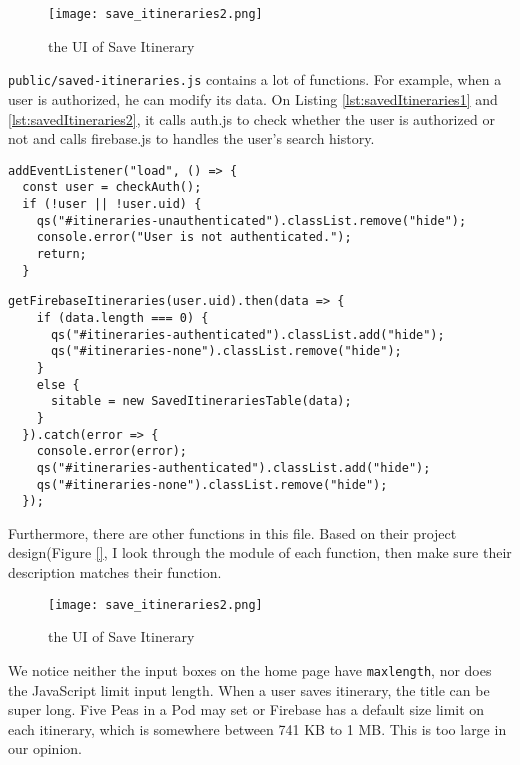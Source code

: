 \documentclass[12pt, a4paper]{article}
\newcommand{\code}[1]{\texttt{#1}}
\begin{document}
\begin{figure}[ht]
\centering
\texttt{[image: save\_itineraries2.png]}
\caption{the UI of Save Itinerary}
\label{fig:save_itineraries2}
\end{figure}

\code{public/saved-itineraries.js} contains a lot of functions. For example, when a user is authorized, he can modify its data. On Listing \ref{lst:savedItineraries1} and \ref{lst:savedItineraries2}, it calls auth.js to check whether the user is authorized or not and calls firebase.js to handles the user's search history.

\begin{lstlisting}[frame=tb, caption=checks if user is authenticated with a call , label=lst:savedItineraries1]
addEventListener("load", () => {
  const user = checkAuth();
  if (!user || !user.uid) {
    qs("#itineraries-unauthenticated").classList.remove("hide");
    console.error("User is not authenticated.");
    return;
  }
\end{lstlisting}

\begin{lstlisting}[frame=tb, caption=Pulls user’s saved itineraries using call to firebase.js, label=lst:savedItineraries2]
getFirebaseItineraries(user.uid).then(data => {
    if (data.length === 0) {
      qs("#itineraries-authenticated").classList.add("hide");
      qs("#itineraries-none").classList.remove("hide");
    }
    else {
      sitable = new SavedItinerariesTable(data);
    }
  }).catch(error => {
    console.error(error);
    qs("#itineraries-authenticated").classList.add("hide");
    qs("#itineraries-none").classList.remove("hide");
  });
\end{lstlisting}

Furthermore, there are other functions in this file. Based on their project design(Figure \ref{}, I look through the module of each function, then make sure their description matches their function.

\begin{figure}[ht]
\centering
\texttt{[image: save\_itineraries2.png]}
\caption{the UI of Save Itinerary}
\label{fig:save_itineraries2}
\end{figure}

We notice neither the input boxes on the home page have \code{maxlength}, nor does the JavaScript limit input length. When a user saves itinerary, the title can be super long. Five Peas in a Pod may set or Firebase has a default size limit on each itinerary, which is somewhere between 741 KB to 1 MB. This is too large in our opinion. 
\end{document}
